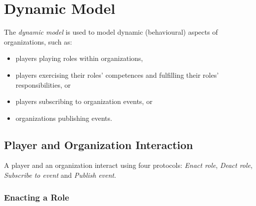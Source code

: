 
\section{Dynamic Model}

The \textit{dynamic model} is used to model dynamic (behavioural) aspects of organizations, such as:
\begin{itemize}
	\item players playing roles within organizations,
	\item players exercising their roles' competences and fulfilling their roles' responsibilities, or
	\item players subscribing to organization events, or
	\item organizations publishing events.
\end{itemize}

\subsection{Player and Organization Interaction}

A player and an organization interact using four protocols: \textit{Enact role}, \textit{Deact role}, \textit{Subscribe to event} and \textit{Publish event}.

\subsubsection{Enacting a Role}

